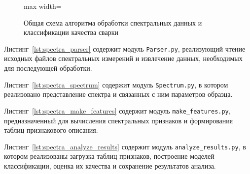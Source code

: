 \begin{figure}[H]
\begin{adjustbox}{max width=\linewidth}
\end{adjustbox}
\caption{Общая схема алгоритма обработки спектральных данных и классификации качества сварки}
\label{fig:spectra_algorithm_scheme}
\end{figure}

Листинг~\ref{lst:spectra_parser} содержит модуль \texttt{Parser.py}, реализующий чтение исходных файлов спектральных измерений и извлечение данных, необходимых для последующей обработки.



Листинг~\ref{lst:spectra_spectrum} содержит модуль \texttt{Spectrum.py}, в котором реализовано представление спектра и связанных с ним параметров образца.



Листинг~\ref{lst:spectra_make_features} содержит модуль \texttt{make\_features.py}, предназначенный для вычисления спектральных признаков и формирования таблиц признакового описания.



Листинг~\ref{lst:spectra_analyze_results} содержит модуль \texttt{analyze\_results.py}, в котором реализованы загрузка таблиц признаков, построение моделей классификации, оценка их качества и сохранение результатов анализа.



\endinput